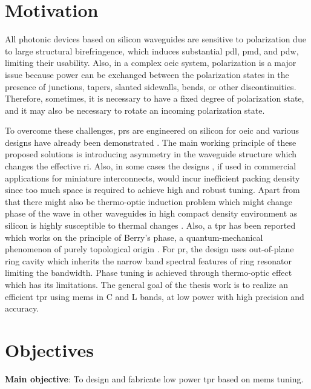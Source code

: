 \documentclass[../report.tex]{subfiles}
\begin{document}
	\section{Motivation} 
All photonic devices based on silicon waveguides are sensitive to polarization due to large structural birefringence, which induces substantial \gls{pdl}, \gls{pmd}, and \gls{pdw}, limiting their usability. Also, in a complex \gls{oeic} system, polarization is a major issue because power can be exchanged between the polarization states in the presence of junctions, tapers, slanted sidewalls, bends, or other discontinuities. Therefore, sometimes, it is necessary to have a fixed degree of polarization state, and it may also be necessary to rotate an incoming polarization state.\par
To overcome these challenges, \gls{pr}s are engineered on silicon for \gls{oeic} and various designs have already been demonstrated \cite{xie_efficient_2015,velasco_ultracompact_2012,leung_numerical_2011,wang_design_2014,dai_novel_2011,wirth_efficient_2012,chen_compact_2011}. The main working principle of these proposed solutions is introducing asymmetry in the waveguide structure which changes the effective \gls{ri}. Also, in some cases the designs \cite{sarmiento-merenguel_demonstration_2015}, if used in commercial applications for miniature interconnects, would incur inefficient packing density since too much space is required to achieve high and robust tuning. Apart from that there might also be thermo-optic induction problem which might change phase of the wave in other waveguides in high compact density environment as silicon is highly susceptible to thermal changes \cite{ibrahim_athermal_2012}. Also, a \gls{tpr} has been reported which works on the principle of Berry’s phase, a quantum-mechanical phenomenon of purely topological origin \cite{xu_electrically_2014}. For \gls{pr}, the design uses out-of-plane ring cavity which inherits the narrow band spectral features of ring resonator limiting the bandwidth. Phase tuning is achieved through thermo-optic effect which has its limitations. The general goal of the thesis work is to realize an efficient \gls{tpr} using \gls{mems} in C and L bands, at low power with high precision and accuracy.    
	\section{Objectives}
\textbf{Main objective}: To design and fabricate low power \gls{tpr} based on \gls{mems} tuning. \\
\end{document}
